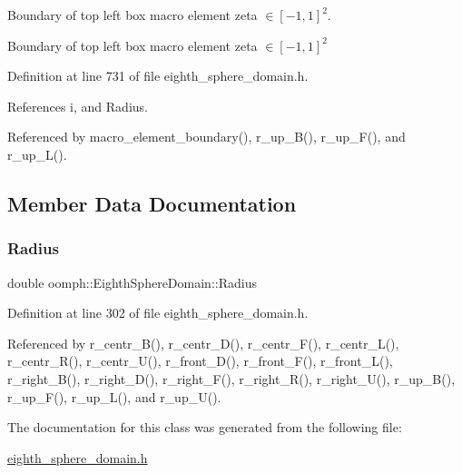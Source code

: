 Boundary of top left box macro element zeta $ \in [-1,1]^2 $. 

Boundary of top left box macro element zeta $ \in [-1,1]^2 $ 

Definition at line 731 of file eighth\+\_\+sphere\+\_\+domain.\+h.



References i, and Radius.



Referenced by macro\+\_\+element\+\_\+boundary(), r\+\_\+up\+\_\+\+B(), r\+\_\+up\+\_\+\+F(), and r\+\_\+up\+\_\+\+L().



\subsection{Member Data Documentation}
\mbox{\label{classoomph_1_1EighthSphereDomain_a9ef9d21c2c9ed0ea28652011b1756419}} 
\subsubsection{\texorpdfstring{Radius}{Radius}}
{\footnotesize\ttfamily double oomph\+::\+Eighth\+Sphere\+Domain\+::\+Radius\hspace{0.3cm}{\ttfamily [private]}}



Definition at line 302 of file eighth\+\_\+sphere\+\_\+domain.\+h.



Referenced by r\+\_\+centr\+\_\+\+B(), r\+\_\+centr\+\_\+\+D(), r\+\_\+centr\+\_\+\+F(), r\+\_\+centr\+\_\+\+L(), r\+\_\+centr\+\_\+\+R(), r\+\_\+centr\+\_\+\+U(), r\+\_\+front\+\_\+\+D(), r\+\_\+front\+\_\+\+F(), r\+\_\+front\+\_\+\+L(), r\+\_\+right\+\_\+\+B(), r\+\_\+right\+\_\+\+D(), r\+\_\+right\+\_\+\+F(), r\+\_\+right\+\_\+\+R(), r\+\_\+right\+\_\+\+U(), r\+\_\+up\+\_\+\+B(), r\+\_\+up\+\_\+\+F(), r\+\_\+up\+\_\+\+L(), and r\+\_\+up\+\_\+\+U().



The documentation for this class was generated from the following file\+:\begin{DoxyCompactItemize}
\item 
\hyperlink{eighth__sphere__domain_8h}{eighth\+\_\+sphere\+\_\+domain.\+h}\end{DoxyCompactItemize}
